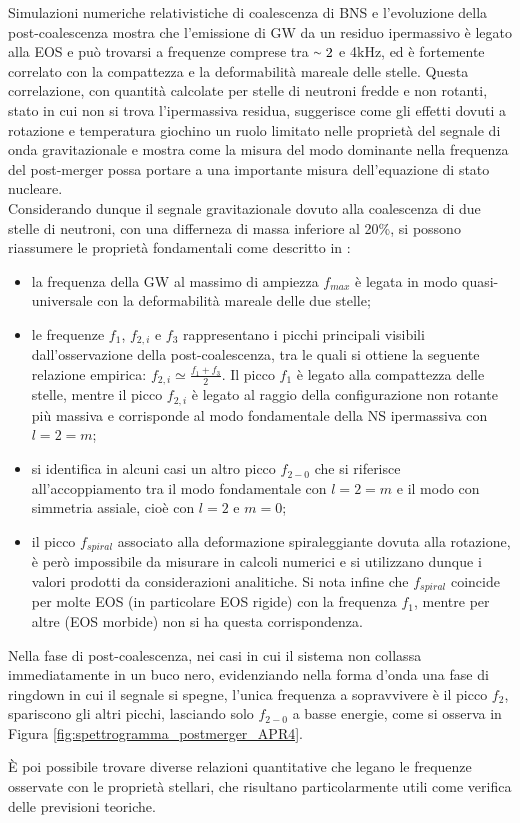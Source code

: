 Simulazioni numeriche relativistiche di coalescenza di BNS e l'evoluzione della post-coalescenza mostra che l'emissione di GW da un residuo ipermassivo è legato alla EOS e può trovarsi a frequenze comprese tra $\smallsim2$ e 4kHz, ed è fortemente correlato con la compattezza e la deformabilità mareale delle stelle. Questa correlazione, con quantità calcolate per stelle di neutroni fredde e non rotanti, stato in cui non si trova l'ipermassiva residua, suggerisce come gli effetti dovuti a rotazione e temperatura giochino un ruolo limitato nelle proprietà del segnale di onda gravitazionale e mostra come la misura del modo dominante nella frequenza del post-merger possa portare a una importante misura dell'equazione di stato nucleare\cite{sarin2020evolution}.\\
Considerando dunque il segnale gravitazionale dovuto alla coalescenza di due stelle di neutroni, con una differneza di massa inferiore al 20\%, si possono riassumere le proprietà fondamentali come descritto in \cite{Rezzolla_2016}:
\begin{itemize}
	\item la frequenza della GW al massimo di ampiezza $f_{max}$ è legata in modo quasi-universale con la deformabilità mareale delle due stelle;
	\item le frequenze $f_1$, $f_{2,i}$ e $f_3$ rappresentano i picchi principali visibili dall'osservazione della post-coalescenza, tra le quali si ottiene la seguente relazione empirica: $f_{2,i}\simeq\frac{f_1 + f_3}{2}$. Il picco $f_1$ è legato alla compattezza delle stelle, mentre il picco $f_{2,i}$ è legato al raggio della configurazione non rotante più massiva e corrisponde al modo fondamentale della NS ipermassiva con $l=2=m$;
	\item si identifica in alcuni casi un altro picco $f_{2-0}$ che si riferisce all'accoppiamento tra il modo fondamentale con $l=2=m$ e il modo con simmetria assiale, cioè con $l=2$ e $m=0$;
	\item il picco $f_{spiral}$ associato alla deformazione spiraleggiante dovuta alla rotazione, è però impossibile da misurare in calcoli numerici e si utilizzano dunque i valori prodotti da considerazioni analitiche. Si nota infine che $f_{spiral}$ coincide per molte EOS (in particolare EOS rigide) con la frequenza $f_1$, mentre per altre (EOS morbide) non si ha questa corrispondenza.
\end{itemize}

Nella fase di post-coalescenza, nei casi in cui il sistema non collassa immediatamente in un buco nero, evidenziando nella forma d'onda una fase di ringdown in cui il segnale si spegne, l'unica frequenza a sopravvivere è il picco $f_2$, spariscono gli altri picchi, lasciando solo $f_{2-0}$ a basse energie, come si osserva in Figura \ref{fig:spettrogramma_postmerger_APR4}.

È poi possibile trovare diverse relazioni quantitative che legano le frequenze osservate con le proprietà stellari, che risultano particolarmente utili come verifica delle previsioni teoriche.
